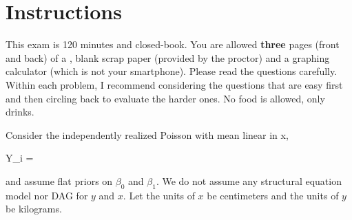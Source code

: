 \documentclass[12pt]{article}
\begin{document}
\section*{Instructions}
This exam is 120 minutes and closed-book. You are allowed \textbf{three} pages (front and back) of a , blank scrap paper (provided by the proctor) and a graphing calculator (which is not your smartphone). Please read the questions carefully. Within each problem, I recommend considering the questions that are easy first and then circling back to evaluate the harder ones. No food is allowed, only drinks. %

\pagebreak

\problem Consider the independently realized Poisson with mean linear in x,

\beqn
Y_i \inddist {} = 
\eeqn

\noindent and assume flat priors on $\beta_0$ and $\beta_1$. We do not assume any structural equation model nor DAG for $y$ and $x$. Let the units of $x$ be centimeters and the units of $y$ be kilograms.
\end{document}
